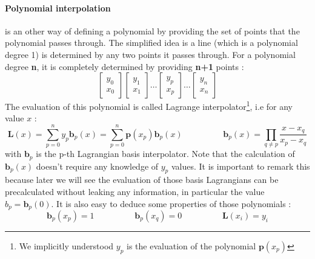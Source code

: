 \documentclass[a4paper,10pt]{article}
\begin{document}
\paragraph{Polynomial interpolation} is an other way of defining a polynomial by providing the set of points that the polynomial passes through. The simplified idea is a line (which is a polynomial degree 1) is determined by any two points it passes through. For a polynomial degree \textbf{n}, it is completely determined by providing \textbf{n+1} points :
\[ 
\left[ \begin{array}{c} y_0 \\ x_0 \end{array} \right]
\left[ \begin{array}{c} y_1 \\ x_1 \end{array} \right]
\dots
\left[ \begin{array}{c} y_p \\ x_p \end{array} \right]
\dots
\left[ \begin{array}{c} y_n \\ x_n \end{array} \right]
\]
The evaluation of this polynomial is called Lagrange interpolator\footnote{We implicitly understood $y_p$ is the evaluation of the polynomial $\textbf{p}(x_p)$}, i.e for any value $x$ :
\begin{equation}
\label{eq:interpolation_eq0}
\textbf{L}(x) = \sum^{n}_{p=0} y_p \textbf{b}_p(x) = \sum^{n}_{p=0} \textbf{p}(x_p) \textbf{b}_p(x)
\hspace{2cm}
\textbf{b}_p(x) = \prod_{q \neq p}\frac{x - x_q}{x_p - x_q}
\end{equation}
with $\textbf{b}_p$ is the p-th Lagrangian basis interpolator. Note that the calculation of $\textbf{b}_p(x)$ doesn't require any knowledge of $y_p$ values. It is important to remark this because later we will see the evaluation of those basis Lagrangians can be precalculated without leaking any information, in particular the value $b_p = \textbf{b}_p(0)$. It is also easy to deduce some properties of those polynomials :
\[
\textbf{b}_p(x_p) = 1
\hspace{2cm}
\textbf{b}_p(x_q) = 0
\hspace{2cm}
\textbf{L}(x_i) = y_i
\]
\end{document}

